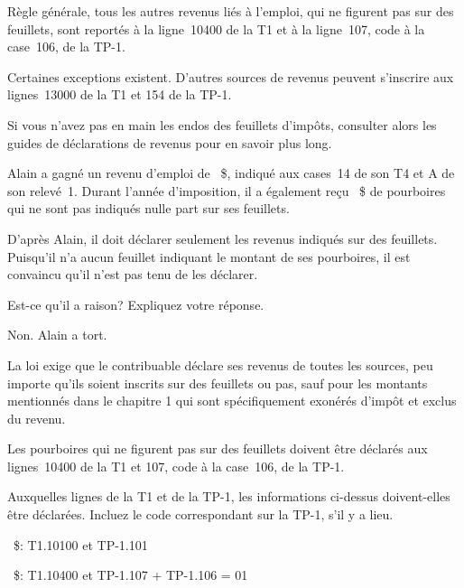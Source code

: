 Règle générale, tous les autres revenus liés à l'emploi, qui ne figurent pas sur des feuillets, sont reportés à la ligne~10400 de la T1 et à la ligne~107, code \fg{} à la case~106, de la TP-1.

Certaines exceptions existent.
D'autres sources de revenus peuvent s'inscrire aux lignes~13000 de la T1 et 154 de la TP-1.

Si vous n'avez pas en main les endos des feuillets d'impôts, consulter alors les guides de déclarations de revenus pour en savoir plus long.

\begin{question}
	Alain a gagné un revenu d'emploi de ~\$, indiqué aux cases~14 de son T4 et A de son relevé~1. Durant l'année d'imposition, il a également reçu ~\$ de pourboires qui ne sont pas indiqués nulle part sur ses feuillets.
\end{question}
\setcounter{sousQuestion}{0}
\begin{sousQuestion}
	D'après Alain, il doit déclarer seulement les revenus indiqués sur des feuillets. Puisqu'il n'a aucun feuillet indiquant le montant de ses pourboires, il est convaincu qu'il n'est pas tenu de les déclarer. 
	
	Est-ce qu'il a raison? Expliquez votre réponse.
\end{sousQuestion}
Non. Alain a tort.

La loi exige que le contribuable déclare ses revenus de toutes les sources, peu importe qu'ils soient inscrits sur des feuillets ou pas, sauf pour les montants mentionnés dans le chapitre 1 qui sont spécifiquement exonérés d'impôt et exclus du revenu.

Les pourboires qui ne figurent pas sur des feuillets doivent être déclarés aux lignes~10400 de la T1 et 107, code \fg{} à la case~106, de la TP-1.

\begin{sousQuestion}
	Auxquelles lignes de la T1 et de la TP-1, les informations ci-dessus doivent-elles être déclarées. Incluez le code correspondant sur la TP-1, s'il y a lieu.
\end{sousQuestion}

~\$: T1.10100 et TP-1.101

~\$: T1.10400 et TP-1.107 + TP-1.106 = 01

